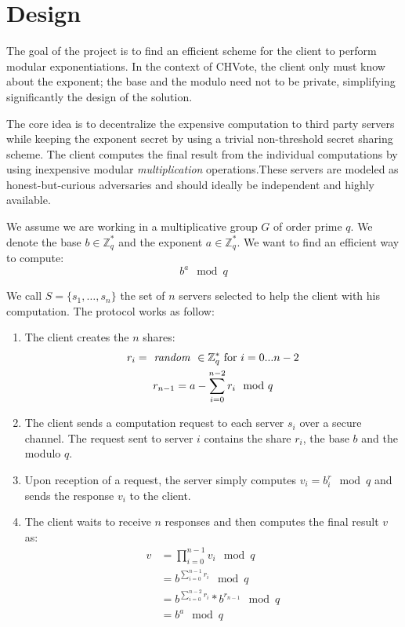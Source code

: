 \documentclass[]{article}
\newcommand{\ZZ}{\ensuremath{\mathbb{Z}}}
\begin{document}
\section{Design} \label{design}

The goal of the project is to find an efficient scheme for the client to perform
modular exponentiations. In the context of CHVote, the client only must know
about the exponent; the base and the modulo need not to be private, simplifying
significantly the design of the solution.

The core idea is to decentralize the expensive computation to third party
servers while keeping the exponent secret by using a trivial non-threshold
secret sharing scheme. The client computes the final result from the individual
computations by using inexpensive modular \textit{multiplication}
operations.These servers are modeled as honest-but-curious adversaries and
should ideally be independent and highly available.


We assume we are working in a multiplicative group $G$ of order prime $q$. We denote
the base $b \in \ZZ_q^*$ and the exponent $a \in \ZZ_q^*$. We want to find an
efficient way to compute: $$ b^a \mod q $$

We call $S = \{s_1,\dots,s_n\}$ the set of $n$ servers selected to help
the client with his computation. The protocol works as follow:
\begin{enumerate}
    \item The client creates the $n$ shares:
        \begin{gather}
            \nonumber r_i = \text{\textit{ random }} \in \ZZ_q^* \text{  for } i=0...n-2\\
            \nonumber r_{n-1} = {a - \sum_{i=0}^{n-2} r_i} \mod q
        \end{gather}
    \item The client sends a computation request to each server $s_i$ over a
        secure channel. The request sent to server $i$ contains the share $r_i$,
        the base $b$ and the modulo $q$.
    \item Upon reception of a request, the server simply computes $ v_i = b^r_i
        \mod q$ and sends the response $v_i$ to the client.
    \item The client waits to receive $n$ responses and then computes the final
        result $v$ as: 
        \begin{align}
          \nonumber v &= \prod_{i=0}^{n-1} {v_i \mod q}\\
          \nonumber   &= b^{\sum_{i=0}^{n-1} r_i} \mod q\\
          \nonumber   &= b^{\sum_{i=0}^{n-2} r_i} * b^{r_{n-1}} \mod q\\
          \nonumber   &= b^a \mod q
        \end{align}
\end{enumerate}
\end{document}

